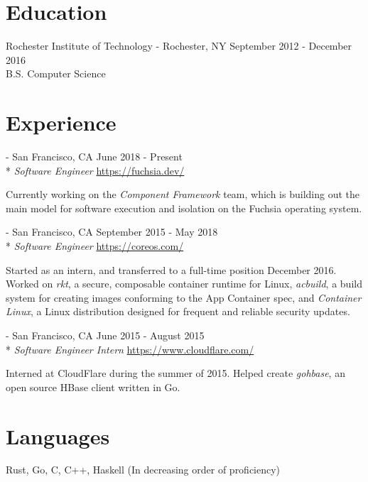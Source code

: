 \documentclass[letterpaper,margin,line,11pt]{resume}
\newcommand{\rurl}[1]{\hfill {\footnotesize \url{#1}}}
\newcommand{\rdate}[1]{\hfill {\small #1}}
\renewcommand{\employer}[5]{\item[#1] - #2 \rdate{#3} \\* #4 \rurl{#5}}
\begin{document}
\begin{resume}
\section{\mysidestyle Education}
    \begin{compactdesc}
        \item[Rochester Institute of Technology] - Rochester, NY \rdate{September 2012 - December 2016}
        \small
        \\B.S. Computer Science
    \end{compactdesc}

\section{\mysidestyle Experience}
    \begin{asparadesc}
        \employer{Google}{San Francisco, CA} {June 2018 - Present}{\textit{Software Engineer}}{https://fuchsia.dev/}

        \small
        Currently working on the \textit{Component Framework} team, which is
        building out the main model for software execution and isolation on the
        Fuchsia operating system.
        \normalsize

        \employer{CoreOS}{San Francisco, CA} {September 2015 - May 2018}{\textit{Software Engineer}}{https://coreos.com/}

        \small
        Started as an intern, and transferred to a full-time
        position December 2016. Worked on \textit{rkt}, a secure, composable
        container runtime for Linux, \textit{acbuild}, a build system for
        creating images conforming to the App Container spec, and
        \textit{Container Linux}, a Linux distribution designed for frequent and
        reliable security updates.
        \normalsize

        \employer{CloudFlare}{San Francisco, CA} {June 2015 - August 2015}{\textit{Software Engineer Intern}}{https://www.cloudflare.com/}

        \small
        Interned at CloudFlare during the summer of 2015. Helped create
        \textit{gohbase}, an open source HBase client written in Go.
        \normalsize
    \end{asparadesc}

\section{\mysidestyle Languages}
    Rust, Go, C, C++, Haskell
    \hfill 
    \footnotesize 
    (In decreasing order of proficiency)
    \normalsize


\end{resume}
\end{document}
